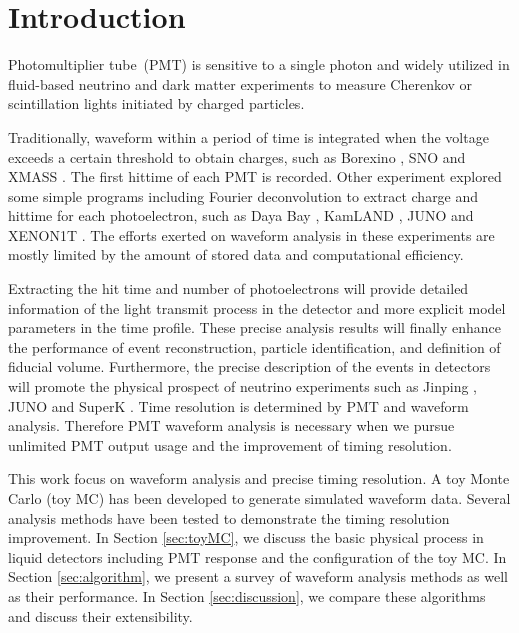 \section{Introduction} %
\label{sec:introduction}

Photomultiplier tube~(PMT) is sensitive to a single photon and widely utilized in fluid-based neutrino and dark matter experiments to measure Cherenkov or scintillation lights initiated by charged particles.

Traditionally, waveform within a period of time is integrated when the voltage exceeds a certain threshold to obtain charges, such as Borexino \cite{lagomarsino_gateless_1999}, SNO \cite{dunger_event_2019} and XMASS \cite{abe_xmass_2013}. The first hittime of each PMT is recorded. Other experiment explored some simple programs including Fourier deconvolution to extract charge and hittime for each photoelectron, such as Daya Bay \cite{huang_flash_2018}, KamLAND \cite{the_kamland_collaboration_production_2010}, JUNO \cite{zhang_comparison_2019} and XENON1T \cite{aprile_xenon1t_2019}. The efforts exerted on waveform analysis in these experiments are mostly limited by the amount of stored data and computational efficiency. 

Extracting the hit time and number of photoelectrons will provide detailed information of the light transmit process in the detector and more explicit model parameters in the time profile. These precise analysis results will finally enhance the performance of event reconstruction, particle identification, and definition of fiducial volume. Furthermore, the precise description of the events in detectors will promote the physical prospect of neutrino experiments such as Jinping \cite{beacom_physics_2017}, JUNO \cite{an_neutrino_2016} and SuperK \cite{noauthor_super-kamiokande_2003}. Time resolution is determined by PMT and waveform analysis. Therefore PMT waveform analysis is necessary when we pursue unlimited PMT output usage and the improvement of timing resolution. 

This work focus on waveform analysis and precise timing resolution. A toy Monte Carlo (toy MC) has been developed to generate simulated waveform data. Several analysis methods have been tested to demonstrate the timing resolution improvement. In Section \ref{sec:toyMC}, we discuss the basic physical process in liquid detectors including PMT response and the configuration of the toy MC. In Section \ref{sec:algorithm}, we present a survey of waveform analysis methods as well as their performance. In Section \ref{sec:discussion}, we compare these algorithms and discuss their extensibility. 

